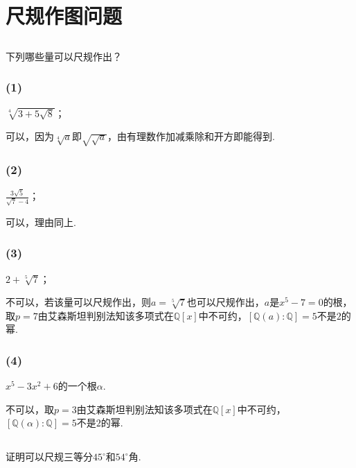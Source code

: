 \section{尺规作图问题}
\subsection{}
下列哪些量可以尺规作出？

\subsubsection{(1)}
$\sqrt[4]{3+5\sqrt{8}}$；

\jie 可以，因为$\sqrt[4]{a}$即$\sqrt{\sqrt{a}}$，由有理数作加减乘除和开方即能得到.

\subsubsection{(2)}
$\frac{3\sqrt{5}}{\sqrt{7}-4}$；

\jie 可以，理由同上.

\subsubsection{(3)}
$2+\sqrt[5]{7}$；

\jie 不可以，若该量可以尺规作出，则$a=\sqrt[5]{7}$也可以尺规作出，$a$是$x^5-7=0$的根，取$p=7$由艾森斯坦判别法知该多项式在$\mathbb{Q}[x]$中不可约，$[\mathbb{Q}(a):\mathbb{Q}]=5$不是$2$的幂.

\subsubsection{(4)}
$x^5-3x^2+6$的一个根$\alpha$.

\jie 不可以，取$p=3$由艾森斯坦判别法知该多项式在$\mathbb{Q}[x]$中不可约，$[\mathbb{Q}(\alpha):\mathbb{Q}]=5$不是$2$的幂.

\subsection{}
证明可以尺规三等分$45^{\circ}$和$54^{\circ}$角.


